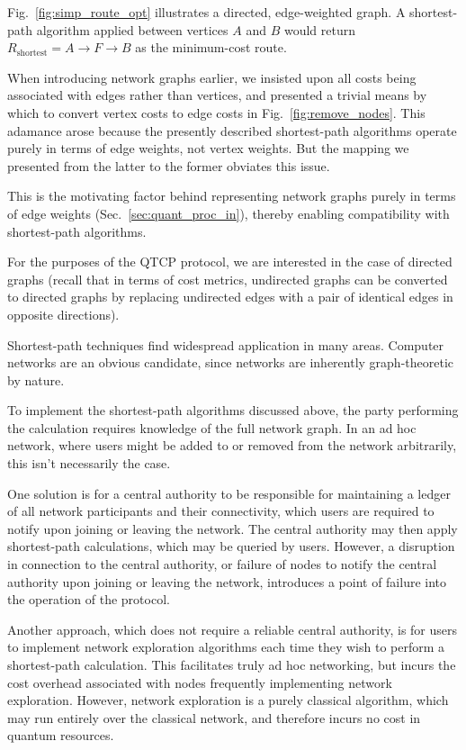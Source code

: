 Fig.~\ref{fig:simp_route_opt} illustrates a directed, edge-weighted graph. A shortest-path algorithm applied between vertices $A$ and $B$ would return \mbox{$R_\mathrm{shortest} = A\to F\to B$} as the minimum-cost route.

When introducing network graphs earlier, we insisted upon all costs being associated with edges rather than vertices, and presented a trivial means by which to convert vertex costs to edge costs in Fig.~\ref{fig:remove_nodes}. This adamance arose because the presently described shortest-path algorithms operate purely in terms of edge weights, not vertex weights. But the mapping we presented from the latter to the former obviates this issue.

This is the motivating factor behind representing network graphs purely in terms of edge weights (Sec.~\ref{sec:quant_proc_in}), thereby enabling compatibility with shortest-path algorithms.

For the purposes of the QTCP protocol, we are interested in the case of directed graphs (recall that in terms of cost metrics, undirected graphs can be converted to directed graphs by replacing undirected edges with a pair of identical edges in opposite directions).

Shortest-path techniques find widespread application in many areas. Computer networks are an obvious candidate, since networks are inherently graph-theoretic by nature.

To implement the shortest-path algorithms discussed above, the party performing the calculation requires knowledge of the full network graph. In an ad hoc network, where users might be added to or removed from the network arbitrarily, this isn't necessarily the case.

One solution is for a central authority to be responsible for maintaining a ledger of all network participants and their connectivity, which users are required to notify upon joining or leaving the network. The central authority may then apply shortest-path calculations, which may be queried by users. However, a disruption in connection to the central authority, or failure of nodes to notify the central authority upon joining or leaving the network, introduces a point of failure into the operation of the protocol.

Another approach, which does not require a reliable central authority, is for users to implement network exploration algorithms each time they wish to perform a shortest-path calculation. This facilitates truly ad hoc networking, but incurs the cost overhead associated with nodes frequently implementing network exploration. However, network exploration is a purely classical algorithm, which may run entirely over the classical network, and therefore incurs no cost in quantum resources.

